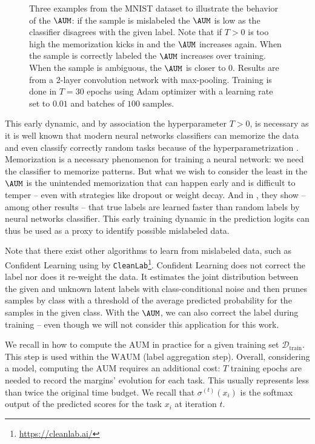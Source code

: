 \begin{figure}[thb]
\begin{center}
\end{center}
\caption{Three examples from the MNIST dataset to illustrate the behavior of the $\AUM$: if the sample is mislabeled the $\AUM$ is low as the classifier disagrees with the given label. Note that if $T>0$ is too high the memorization kicks in and the $\AUM$ increases again. When the sample is correctly labeled the $\AUM$ increases over training. When the sample is ambiguous, the $\AUM$ is closer to $0$. Results are from a 2-layer convolution network with max-pooling. Training is done in $T=30$ epochs using Adam optimizer with a learning rate set to $0.01$ and batches of $100$ samples.}
\label{fig:mnist_aum}
\end{figure}

This early dynamic, and by association the hyperparameter $T>0$, is necessary as it is well known that modern neural networks classifiers can memorize the data and even classify correctly random tasks because of the hyperparametrization \citep{maennel2020neural}.
Memorization is a necessary phenomenon for training a neural network: we need the classifier to memorize patterns.
But what we wish to consider the least in the $\AUM$ is the unintended memorization \citep{maennel2020neural} that can happen early and is difficult to temper -- even with strategies like dropout or weight decay.
And in \citet{zhang2021understanding}, they show -- among other results -- that true labels are learned faster than random labels by neural networks classifier.
This early training dynamic in the prediction logits can thus be used as a proxy to identify possible mislabeled data.

Note that there exist other algorithms to learn from mislabeled data, such as Confident Learning \citep{northcutt_confident_2021} using by \texttt{CleanLab}\footnote{\url{https://cleanlab.ai/}}.
Confident Learning does not correct the label nor does it re-weight the data.
It estimates the joint distribution between the given and unknown latent labels with class-conditional noise and then prunes samples by class with a threshold of the average predicted probability for the samples in the given class.
With the $\AUM$, we can also correct the label during training -- even though we will not consider this application for this work.

We recall in  how to compute the $\mathrm{AUM}$ in practice for a given training set $\mathcal{D}_{\text{train}}$.
This step is used within the $\mathrm{WAUM}$ (label aggregation step).
Overall, considering a model, computing the $\mathrm{AUM}$ requires an additional cost: $T$ training epochs are needed to record the margins' evolution for each task.
This usually represents less than twice the original time budget.
We recall that $\sigma^{(t)}(x_i)$ is the softmax output of the predicted scores for the task $x_i$ at iteration $t$.

